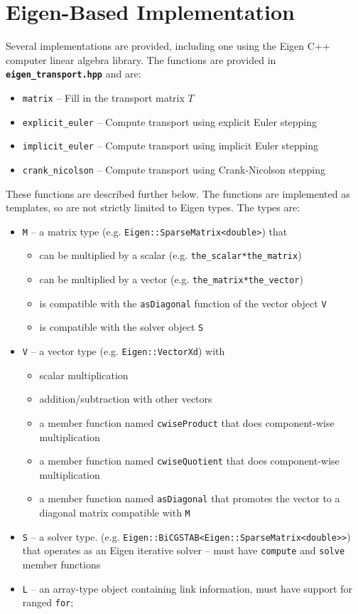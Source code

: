 \documentclass[10pt]{report}
\newcommand{\filename}[1]{\textbf{\texttt{#1}}}
\begin{document}
\section{Eigen-Based Implementation}
Several implementations are provided, including one using the Eigen C++ computer linear
algebra library. The functions are provided in \filename{eigen\_transport.hpp} and are:
\begin{itemize}
\item \texttt{matrix} -- Fill in the transport matrix $T$
\item \texttt{explicit\_euler} -- Compute transport using explicit Euler stepping
\item \texttt{implicit\_euler} -- Compute transport using implicit Euler stepping
\item \texttt{crank\_nicolson} -- Compute transport using Crank-Nicolson stepping
\end{itemize}
These functions are described further below. The functions are implemented as templates, so are not strictly
limited to Eigen types. The types are:
\begin{itemize}
\item \texttt{M} -- a matrix type (e.g. \texttt{Eigen::SparseMatrix\textless{}double\textgreater}) that
\begin{itemize}
\item can be multiplied by a scalar (e.g. \texttt{the\_scalar*the\_matrix})
\item can be multiplied by a vector  (e.g. \texttt{the\_matrix*the\_vector})
\item is compatible with the \texttt{asDiagonal} function of the vector object \texttt{V}
\item is compatible with the solver object \texttt{S}
\end{itemize}
\item \texttt{V} -- a vector type (e.g. \texttt{Eigen::VectorXd}) with
\begin{itemize}
\item scalar multiplication
\item addition/subtraction with other vectors
\item a member function named \texttt{cwiseProduct} that does component-wise multiplication
\item a member function named \texttt{cwiseQuotient} that does component-wise multiplication
\item a member function named \texttt{asDiagonal} that promotes the vector to a diagonal matrix compatible with \texttt{M}
\end{itemize}
\item \texttt{S} -- a solver type. (e.g. \texttt{Eigen::BiCGSTAB\textless{}Eigen::SparseMatrix\textless{}double\textgreater\textgreater}) that operates as an Eigen iterative solver -- must have \texttt{compute} and \texttt{solve} member functions
\item \texttt{L} -- an array-type object containing link information, must have support for ranged \texttt{for};
\end{itemize}
\end{document}
